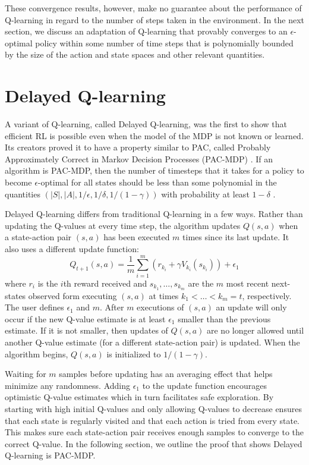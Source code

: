 \documentclass{article} %
\begin{document}
These convergence results, however, make no guarantee about the performance of Q-learning in regard to the number of steps taken in the environment.  In the next section, we discuss an adaptation of Q-learning that provably converges to an $\epsilon$-optimal policy within some number of time steps that is polynomially bounded by the size of the action and state spaces and other relevant quantities.

\section{Delayed Q-learning}
A variant of Q-learning, called Delayed Q-learning, was the first to show that efficient RL is possible even when the model of the MDP is not known or learned.  Its creators proved it to have a property similar to PAC, called Probably Approximately Correct in Markov Decision Processes (PAC-MDP) \cite{strehl_pac_2006}.  If an algorithm is PAC-MDP, then the number of timesteps that it takes for a policy to become $\epsilon$-optimal for all states should be less than some polynomial in the quantities $(\left|S\right|,\left|A\right|,1/\epsilon,1/\delta,1/(1-\gamma))$ with probability at least $1-\delta$ \cite{kakade}.


Delayed Q-learning differs from traditional Q-learning in a few ways.  Rather than updating the Q-values at every time step, the algorithm updates $Q(s,a)$ when a state-action pair $(s,a)$ has been executed $m$ times since its last update.  It also uses a different update function:
$$Q_{t+1}(s,a) = \frac{1}{m}\sum_{i=1}^m(r_{k_i}+\gamma V_{k_i}(s_{k_i})) + \epsilon_1$$  
where $r_i$ is the $i$th reward received and $s_{k_1},\dots,s_{k_m}$ are the $m$ most recent next-states observed form executing $(s,a)$ at times $k_1 < \dots < k_m = t$, respectively. The user defines $\epsilon_1$ and $m$.  After $m$ executions of $(s,a)$ an update will only occur if the new Q-value estimate is at least $\epsilon_1$ smaller than the previous estimate.  If it is not smaller, then updates of $Q(s,a)$ are no longer allowed until another Q-value estimate (for a different state-action pair) is updated.  When the algorithm begins, $Q(s,a)$ is initialized to $1/(1-\gamma)$.

Waiting for $m$ samples before updating has an averaging effect that helps minimize any randomness. Adding $\epsilon_1$ to the update function encourages optimistic Q-value estimates which in turn facilitates safe exploration. By starting with high initial Q-values and only allowing Q-values to decrease ensures that each state is regularly visited and that each action is tried from every state.  This makes sure each state-action pair receives enough samples to converge to the correct Q-value.  In the following section, we outline the proof that shows Delayed Q-learning is PAC-MDP.
\end{document}
